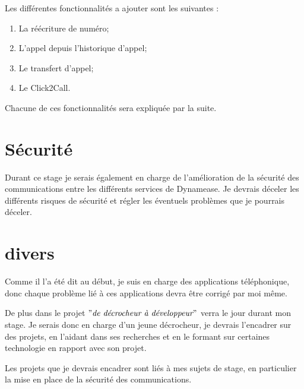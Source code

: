 Les différentes fonctionnalités a ajouter sont les suivantes :

\begin{enumerate}
	\item La réécriture de numéro;
	\item L'appel depuis l'historique d'appel;
	\item Le transfert d'appel;
	\item Le Click2Call.
\end{enumerate}

Chacune de ces fonctionnalités sera expliquée par la suite.

\section{Sécurité}

Durant ce stage je serais également en charge de l'amélioration de la sécurité des communications entre les différents services de Dynamease. Je devrais déceler les différents risques de sécurité et régler les éventuels problèmes que je pourrais déceler.

\section{divers}

Comme il l'a été dit au début, je suis en charge des applications téléphonique, donc chaque problème lié à ces applications devra être corrigé par moi même.

De plus dans le projet $"\textit{de décrocheur à développeur}"$ verra le jour durant mon stage. Je serais donc en charge d'un jeune décrocheur, je devrais l'encadrer sur des projets, en l'aidant dans ses recherches et en le formant sur certaines technologie en rapport avec son projet.

Les projets que je devrais encadrer sont liés à mes sujets de stage, en particulier la mise en place de la sécurité des communications.